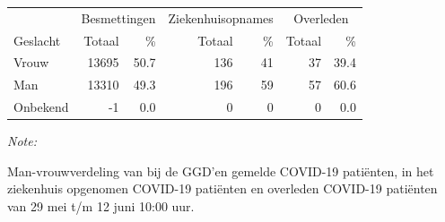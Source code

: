 \documentclass[
  english,
  man,floatsintext]{apa6}
\begin{document}
\begin{table}
\centering\begingroup\fontsize{11}{13}\selectfont

\begin{threeparttable}
\begin{tabular}{lrrrrrr}
\toprule
\multicolumn{1}{c}{ } & \multicolumn{2}{c}{Besmettingen} & \multicolumn{2}{c}{Ziekenhuisopnames} & \multicolumn{2}{c}{Overleden} \\
\cmidrule(l{3pt}r{3pt}){2-3} \cmidrule(l{3pt}r{3pt}){4-5} \cmidrule(l{3pt}r{3pt}){6-7}
Geslacht & Totaal & \% & Totaal & \% & Totaal & \%\\
\midrule
Vrouw & 13695 & 50.7 & 136 & 41 & 37 & 39.4\\
Man & 13310 & 49.3 & 196 & 59 & 57 & 60.6\\
Onbekend & -1 & 0.0 & 0 & 0 & 0 & 0.0\\
\bottomrule
\end{tabular}
\begin{tablenotes}
\item \textit{Note: } 
\item Man-vrouwverdeling van bij de GGD’en gemelde COVID-19 patiënten, in het ziekenhuis opgenomen COVID-19 patiënten en overleden COVID-19 patiënten van 29 mei t/m 12 juni 10:00 uur.
\end{tablenotes}
\end{threeparttable}
\endgroup{}
\end{table}
\newpage
\end{document}
